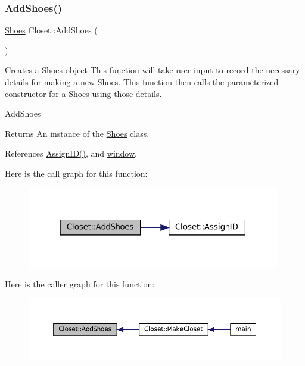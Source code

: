 \subsubsection{\texorpdfstring{Add\+Shoes()}{AddShoes()}}
{\footnotesize\ttfamily \mbox{\hyperlink{classShoes}{Shoes}} Closet\+::\+Add\+Shoes (\begin{DoxyParamCaption}{ }\end{DoxyParamCaption})\hspace{0.3cm}{\ttfamily [private]}}



Creates a \textquotesingle{}\mbox{\hyperlink{classShoes}{Shoes}}\textquotesingle{} object  This function will take user input to record the necessary details for making a new \textquotesingle{}\mbox{\hyperlink{classShoes}{Shoes}}\textquotesingle{}. This function then calls the parameterized constructor for a \textquotesingle{}\mbox{\hyperlink{classShoes}{Shoes}}\textquotesingle{} using those details. 

Add\+Shoes \begin{DoxyReturn}{Returns}
An instance of the \textquotesingle{}\mbox{\hyperlink{classShoes}{Shoes}}\textquotesingle{} class. 
\end{DoxyReturn}


References \mbox{\hyperlink{classCloset_afabc27d621abdf0089a6b3027ea8f470}{Assign\+I\+D()}}, and \mbox{\hyperlink{classCloset_af1eb4f786cc4eccd3018b90632236a93}{window}}.

Here is the call graph for this function\+:
\nopagebreak
\begin{figure}[H]
\begin{center}
\leavevmode
\includegraphics[width=313pt]{classCloset_a489badac5a919460e8cc8e216f8b3eac_cgraph}
\end{center}
\end{figure}
Here is the caller graph for this function\+:
\nopagebreak
\begin{figure}[H]
\begin{center}
\leavevmode
\includegraphics[width=350pt]{classCloset_a489badac5a919460e8cc8e216f8b3eac_icgraph}
\end{center}
\end{figure}
\mbox{\label{classCloset_aac44ecf78525b3e0ac4ed80af2133186}} 
